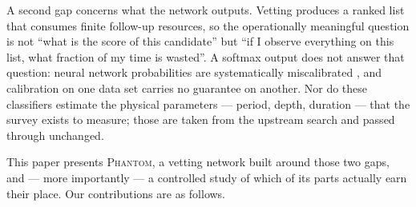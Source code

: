 \documentclass[preprint,12pt,authoryear]{elsarticle}
\newcommand{\phantomnet}{\textsc{Phantom}}
\begin{document}
A second gap concerns what the network outputs. Vetting produces a ranked list
that consumes finite follow-up resources, so the operationally meaningful
question is not ``what is the score of this candidate'' but ``if I observe
everything on this list, what fraction of my time is wasted''. A softmax output
does not answer that question: neural network probabilities are systematically
miscalibrated \citep{Guo2017}, and calibration on one data set carries no
guarantee on another. Nor do these classifiers estimate the physical parameters
--- period, depth, duration --- that the survey exists to measure; those are
taken from the upstream search and passed through unchanged.

This paper presents \phantomnet{}, a vetting network built around those two
gaps, and --- more importantly --- a controlled study of which of its parts
actually earn their place. Our contributions are as follows.
\end{document}
